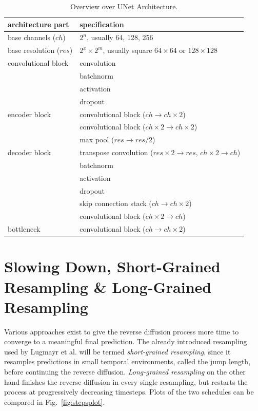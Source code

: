 \begin{table}
    \centering
    \caption[Overview over UNet Architecture]{Overview over UNet Architecture.}
    \label{tab:unetlayers}
    \begin{tabular}{l l}
        \textbf{architecture part}     & \textbf{specification}                                                            \\
        \hline\hline
        base channels ($ch$)           & $2^n$, usually 64, 128, 256                                                       \\
        \hline base resolution ($res$) & $2^x \times 2^m$, usually square $64\times 64$ or $128\times 128$                 \\ \hline
        convolutional block            & convolution                                                                       \\ & batchnorm\\ & activation\\ & dropout                         \\
        \hline encoder block           & convolutional block ($ch \rightarrow ch\times 2$)                                 \\ & convolutional block ($ch\times 2 \rightarrow ch\times 2$) \\ & max pool ($res\rightarrow res/ 2$) \\
        \hline decoder block           & transpose convolution ($res\times 2\rightarrow res$, $ch\times 2 \rightarrow ch$) \\ & batchnorm\\ & activation\\ & dropout \\ & skip connection stack ($ch \rightarrow ch\times 2$) \\ & convolutional block ($ch\times 2 \rightarrow ch$)\\
        \hline bottleneck              & convolutional block ($ch \rightarrow ch\times 2$)
    \end{tabular}
\end{table}


\section{Slowing Down, Short-Grained Resampling \& Long-Grained Resampling}
\label{sec:morecompute}
Various approaches exist to give the reverse diffusion process more time to converge to a meaningful final prediction. The already introduced resampling used by Lugmayr et al. will be termed \textit{short-grained resampling}, since it resamples predictions in small temporal environments, called the jump length, before continuing the reverse diffusion. \textit{Long-grained resampling} on the other hand finishes the reverse diffusion in every single resampling, but restarts the process at progressively decreasing timesteps. Plots of the two schedules can be compared in Fig.~\ref{fig:stepsplot}.


